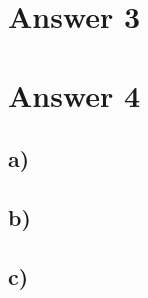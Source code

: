 \documentclass[12pt]{article}
\begin{document}
\section*{Answer 3}


\section*{Answer 4}

\subsection*{a)} 

\subsection*{b)} 

\subsection*{c)} 
\end{document}
